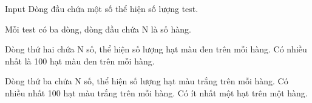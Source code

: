 Input  
Dòng đầu chứa một số thể hiện số lượng test.  

   Mỗi test có ba dòng, dòng đầu chứa N là số hàng.  

   Dòng thứ hai chứa N số, thể hiện số lượng hạt màu đen trên mỗi hàng. Có nhiều nhất là 100 hạt màu đen trên mỗi hàng.  

   Dòng thứ ba chứa N số, thể hiện số lượng hạt màu trắng trên mỗi hàng. Có nhiều nhất 100 hạt màu trắng trên mỗi hàng. Có ít nhất một hạt trên một hàng.